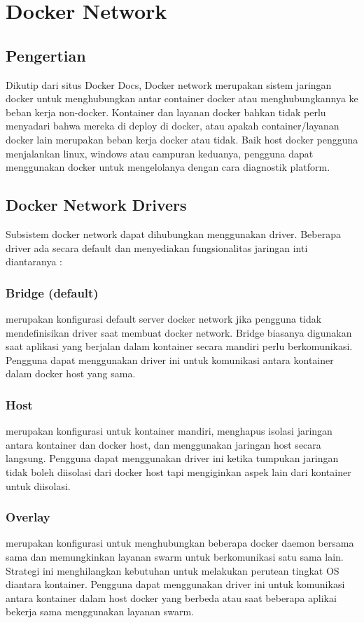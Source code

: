\chapter{Docker Network}
\section{Pengertian}
Dikutip dari situs Docker Docs, Docker network merupakan sistem jaringan docker untuk menghubungkan antar container docker atau menghubungkannya ke beban kerja non-docker.
Kontainer dan layanan docker bahkan tidak perlu menyadari bahwa mereka di deploy di docker, atau apakah container/layanan docker lain merupakan beban kerja docker atau tidak.
Baik host docker pengguna menjalankan linux, windows atau campuran keduanya, pengguna dapat menggunakan docker untuk mengelolanya dengan cara diagnostik platform.

\section{Docker Network Drivers}
Subsistem docker network dapat dihubungkan menggunakan driver. Beberapa driver ada secara default dan menyediakan fungsionalitas jaringan inti diantaranya :
\subsection{Bridge (default)}
merupakan konfigurasi default server docker network jika pengguna tidak mendefinisikan driver saat membuat docker network. Bridge biasanya digunakan saat aplikasi 
yang berjalan dalam kontainer secara mandiri perlu berkomunikasi. Pengguna dapat menggunakan driver ini untuk komunikasi antara kontainer dalam docker host yang sama.
\subsection{Host}
merupakan konfigurasi untuk kontainer mandiri, menghapus isolasi jaringan antara kontainer dan docker host, dan menggunakan jaringan host secara langsung. Pengguna dapat menggunakan driver ini
ketika tumpukan jaringan tidak boleh diisolasi dari docker host tapi mengiginkan aspek lain dari kontainer untuk diisolasi.
\subsection{Overlay}
merupakan konfigurasi untuk menghubungkan beberapa docker daemon bersama sama dan memungkinkan layanan swarm untuk berkomunikasi satu sama lain. Strategi ini menghilangkan kebutuhan untuk melakukan perutean tingkat OS diantara kontainer.
Pengguna dapat menggunakan driver ini untuk komunikasi antara kontainer dalam host docker yang berbeda atau saat beberapa aplikai bekerja sama menggunakan layanan swarm.
